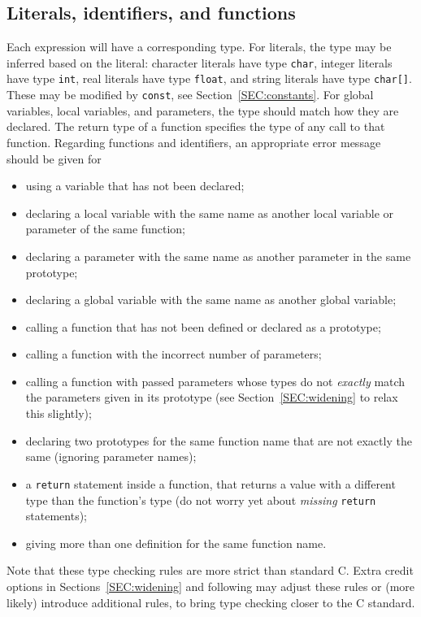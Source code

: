 \documentclass{article}
\newcounter{rule}
\begin{document}
\subsection{Literals, identifiers, and functions}

Each expression will have a corresponding type.
For literals, the type may be inferred based on the literal:
character literals have type {\tt char},
integer literals have type {\tt int},
real literals have type {\tt float},
and string literals have type {\tt char[]}.
These may be modified by {\tt const}, see Section~\ref{SEC:constants}.
For global variables, local variables, and parameters,
the type should match how they are declared.
The return type of a function specifies the type of any call to that
function.
Regarding functions and identifiers,
an appropriate error message should be given for
\begin{itemize}
  \item
  using a variable that has not been declared;

  \item
  declaring a local variable with the same name as another
  local variable or parameter of the same function;

  \item
  declaring a parameter with the same name as another parameter
  in the same prototype;

  \item
  declaring a global variable with the same name as another
  global variable;

  \item
  calling a function that has not been defined or declared as a prototype;

  \item
  calling a function with the incorrect number of parameters;

  \item
  calling a function with passed parameters whose types
  do not \emph{exactly} match the parameters given in its prototype
    (see Section~\ref{SEC:widening} to relax this slightly);

  \item
  declaring two prototypes for the same function name
  that are not exactly the same (ignoring parameter names);

  \item
  a {\tt return} statement inside a function,
  that returns a value with a different type than the function's type
  (do not worry yet about \emph{missing} {\tt return} statements);

  \item
  giving more than one definition for the same function name.

\end{itemize}
Note that these type checking rules are more strict than standard C.
Extra credit options in Sections~\ref{SEC:widening} and following
may adjust these rules or (more likely)
introduce additional rules,
to bring type checking closer to the C standard.
\end{document}
